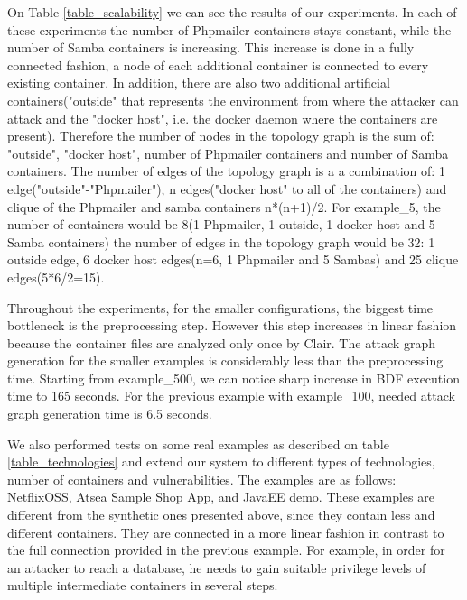 On Table \ref{table_scalability} we can see the results of our experiments. In each of these experiments the number of Phpmailer containers stays constant, while the number of Samba containers is increasing. This increase is done in a fully connected fashion, a node of each additional container is connected to every existing container. In addition, there are also two additional artificial containers("outside" that represents the environment from where the attacker can attack and the "docker host", i.e. the docker daemon where the containers are present). Therefore the number of nodes in the topology graph is the sum of: "outside", "docker host", number of Phpmailer containers and number of Samba containers. The number of edges of the topology graph is a a combination of: 1 edge("outside"-"Phpmailer"), n edges("docker host" to all of the containers) and clique of the Phpmailer and samba containers n*(n+1)/2. For example\_5, the number of containers would be 8(1 Phpmailer, 1 outside, 1 docker host and 5 Samba containers) the number of edges in the topology graph would be 32: 1 outside edge, 6 docker host edges(n=6, 1 Phpmailer and 5 Sambas) and 25 clique edges(5*6/2=15).

Throughout the experiments, for the smaller configurations, the biggest time bottleneck is the preprocessing step. However this step increases in linear fashion because the container files are analyzed only once by Clair. The attack graph generation for the smaller examples is considerably less than the preprocessing time. Starting from example\_500, we can notice sharp increase in BDF execution time to 165 seconds. For the previous example with example\_100, needed attack graph generation time is 6.5 seconds.

We also performed tests on some real examples as described on table \ref{table_technologies} and extend our system to different types of technologies, number of containers and vulnerabilities. The examples are as follows: NetflixOSS, Atsea Sample Shop App, and JavaEE demo. These examples are different from the synthetic ones presented above, since they contain less and different containers. They are connected in a more linear fashion in contrast to the full connection provided in the previous example. For example, in order for an attacker to reach a database, he needs to gain suitable privilege levels of multiple intermediate containers in several steps.


